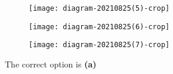 \begin{enumerate}
\begin{tasks}
\begin{figure}[H]
		\end{figure}
		\task[\textbf{B.}]\begin{figure}[H]
			\centering
			\texttt{[image: diagram-20210825(5)-crop]}
		\end{figure}
		\task[\textbf{C.}]\begin{figure}[H]
			\centering
			\texttt{[image: diagram-20210825(6)-crop]}
		\end{figure}
		\task[\textbf{D.}]\begin{figure}[H]
			\centering
			\texttt{[image: diagram-20210825(7)-crop]}
		\end{figure}
	\end{tasks}
	\begin{answer}
		The correct option is \textbf{(a)}	
	\end{answer}
\end{enumerate}